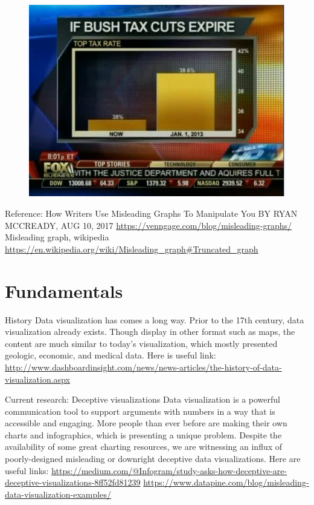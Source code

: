\documentclass[]{book}
\theoremstyle{definition}
\theoremstyle{definition}
\theoremstyle{definition}
\theoremstyle{remark}
\begin{document}
\begin{figure}
\centering
\includegraphics{1.png}
\caption{}
\end{figure}

Reference: How Writers Use Misleading Graphs To Manipulate You BY RYAN
MCCREADY, AUG 10, 2017
\url{https://venngage.com/blog/misleading-graphs/} Misleading graph,
wikipedia
\url{https://en.wikipedia.org/wiki/Misleading_graph\#Truncated_graph}

\chapter{Fundamentals}\label{fundamentals-1}

History Data visualization has comes a long way. Prior to the 17th
century, data visualization already exists. Though display in other
format such as maps, the content are much similar to today's
visualization, which mostly presented geologic, economic, and medical
data. Here is useful link:
\url{http://www.dashboardinsight.com/news/news-articles/the-history-of-data-visualization.aspx}

Current research: Deceptive visualizations Data visualization is a
powerful communication tool to support arguments with numbers in a way
that is accessible and engaging. More people than ever before are making
their own charts and infographics, which is presenting a unique problem.
Despite the availability of some great charting resources, we are
witnessing an influx of poorly-designed misleading or downright
deceptive data visualizations. Here are useful links:
\url{https://medium.com/@Infogram/study-asks-how-deceptive-are-deceptive-visualizations-8ff52fd81239}
\url{https://www.datapine.com/blog/misleading-data-visualization-examples/}


\end{document}
